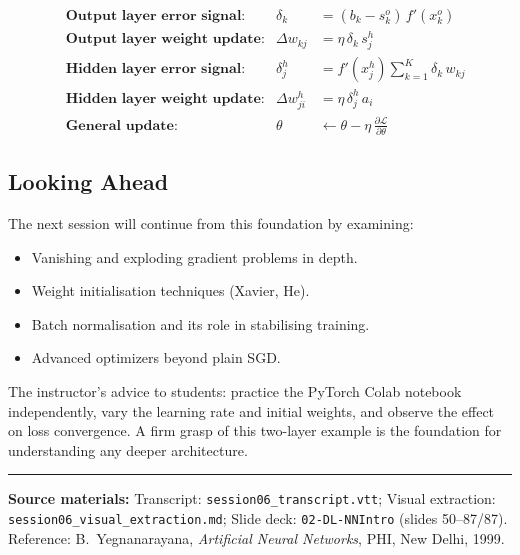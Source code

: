 \documentclass[12pt,a4paper]{article}
\newcommand{\pd}[2]{\frac{\partial #1}{\partial #2}}
\newcommand{\wji}{w_{ji}^{h}}
\newcommand{\wkj}{w_{kj}}
\newcommand{\sho}{s_{j}^{h}}
\newcommand{\sko}{s_{k}^{o}}
\newcommand{\deltak}{\delta_{k}}
\newcommand{\deltajh}{\delta_{j}^{h}}
\newcommand{\xho}{x_{j}^{h}}
\newcommand{\xko}{x_{k}^{o}}
\begin{document}
\begin{keyinsight}[title=Essential Backpropagation Formulae]
\begin{align*}
  &\textbf{Output layer error signal:}
  &\deltak &= (b_k - \sko)\,f'(\xko)\\
  &\textbf{Output layer weight update:}
  &\Delta\wkj &= \eta\,\deltak\,\sho\\
  &\textbf{Hidden layer error signal:}
  &\deltajh &= f'(\xho)\sum_{k=1}^{K}\deltak\,\wkj\\
  &\textbf{Hidden layer weight update:}
  &\Delta\wji &= \eta\,\deltajh\,a_i\\
  &\textbf{General update:}
  &\theta &\leftarrow \theta - \eta\,\pd{\mathcal{L}}{\theta}
\end{align*}
\end{keyinsight}

\subsection{Looking Ahead}

The next session will continue from this foundation by examining:

\begin{itemize}[noitemsep]
  \item Vanishing and exploding gradient problems in depth.
  \item Weight initialisation techniques (Xavier, He).
  \item Batch normalisation and its role in stabilising training.
  \item Advanced optimizers beyond plain SGD.
\end{itemize}

The instructor's advice to students: practice the PyTorch Colab notebook
independently, vary the learning rate and initial weights, and observe the
effect on loss convergence.  A firm grasp of this two-layer example is the
foundation for understanding any deeper architecture.

\vspace{1cm}
\hrule
\vspace{0.4cm}
{\small
\textbf{Source materials:}
Transcript: \texttt{session06\_transcript.vtt};
Visual extraction: \texttt{session06\_visual\_extraction.md};
Slide deck: \texttt{02-DL-NNIntro} (slides 50--87/87).
Reference: B.\ Yegnanarayana, \textit{Artificial Neural Networks}, PHI,
New Delhi, 1999.
}

\clearpage

\end{document}
